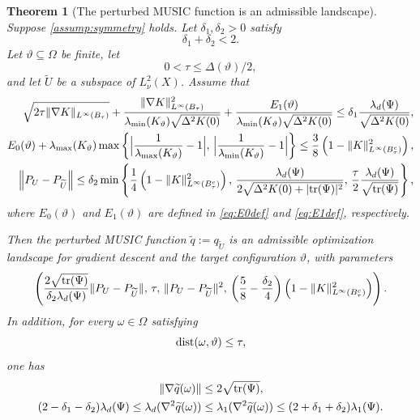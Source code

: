 \documentclass[11pt]{article}
\newtheorem{theorem}{Theorem}
\theoremstyle{definition}
\numberwithin{theorem}{section}
\numberwithin{lemma}{section}
\numberwithin{equation}{section}
\renewcommand{\subset}{\subseteq}
\renewcommand{\tilde}{\widetilde}
\def\dist{{\rm dist}}
\def\trace{{\rm tr}}
\newcommand{\domain}{\Omega}
\newcommand{\norm}[1]{{\left\|#1\right\|}}
\numberwithin{equation}{section}
\begin{document}
\begin{theorem}[The perturbed MUSIC function is an admissible landscape]
\label{thm:maingeometric}
Suppose \cref{assump:symmetry} holds. Let $\delta_1,\delta_2>0$ satisfy
\[
\delta_1+\delta_2<2.
\]
Let $\vartheta\subset \domain$ be finite, let
\[
0<\tau\le {\Delta(\vartheta)}/{2},
\]
and let $\tilde U$ be a subspace of $L^2_\nu(X)$. Assume that
	\begin{align}
    		\sqrt{2 \tau \|\nabla K\|_{L^\infty(B_\tau)}} + \frac{\|\nabla K\|_{L^\infty(B_\tau)}^2}{\lambda_{\min}(K_\vartheta) \sqrt{\Delta^2 K(0)} } + \frac{E_1(\vartheta)}{\lambda_{\min}(K_\vartheta) \sqrt{\Delta^2 K(0)}}
    		\leq \delta_1 \frac{\lambda_d(\Psi)}{\sqrt{\Delta^2 K(0)}}, \label{eq:betacondition1} \\ 
    		E_0(\vartheta)+\lambda_{\max}(K_\vartheta) \max\left\{ \Big| \frac 1 {\lambda_{\max}(K_\vartheta)}-1\Big|,\, \Big|\frac 1 {\lambda_{\min}(K_\vartheta)} - 1\Big| \right\} 
    		\leq \frac 38 \left( 1 - \|K\|_{L^\infty(B_\tau^c)}^2 \right),
    		\label{eq:betacondition2} \\
    		\norm{P_U-P_{\tilde U}}
    		\leq \delta_2 \min \left\{ \frac 1 4 \left( 1- \|K\|_{L^\infty(B_\tau^c)}^2 \right), \,   \frac{\lambda_d(\Psi)}{2 \sqrt{ \Delta^2 K(0) + |\trace(\Psi)|^2}}, \, \frac{\tau}{2}\frac{\lambda_d(\Psi)} {\sqrt{\trace(\Psi)}} \right\},	\label{eq:noisecondition}
    	\end{align} 
where $E_0(\vartheta)$ and $E_1(\vartheta)$ are defined in \eqref{eq:E0def} and \eqref{eq:E1def}, respectively.

Then the perturbed MUSIC function $
\tilde q:=q_{\tilde U}$
is an admissible optimization landscape for gradient descent and the target configuration $\vartheta$, with parameters
\begin{equation}
\label{eq:mainparameters}
\left(
\frac{2\sqrt{\trace(\Psi)}}{\delta_2\lambda_d(\Psi)}
\|P_U-P_{\tilde U}\|,
\,
\tau,
\,
\|P_U-P_{\tilde U}\|^2,
\,
\left(\frac58-\frac{\delta_2}{4}\right)
\Bigl(1-\|K\|_{L^\infty(B_\tau^c)}^2\Bigr)
\right).
\end{equation}
In addition, for every $\omega\in\Omega$ satisfying
\[
\dist(\omega,\vartheta)\le \tau,
\]
one has
\begin{align}
\|\nabla \tilde q(\omega)\|
&\le
2\sqrt{\trace(\Psi)},
\label{eq:qtilde1}
\\
(2-\delta_1-\delta_2)\lambda_d(\Psi)
\le
\lambda_d(\nabla^2 \tilde q(\omega))
&\le
\lambda_1(\nabla^2 \tilde q(\omega))
\le
(2+\delta_1+\delta_2)\lambda_1(\Psi).
\label{eq:qtilde2}
\end{align}
\end{theorem}
\end{document}
